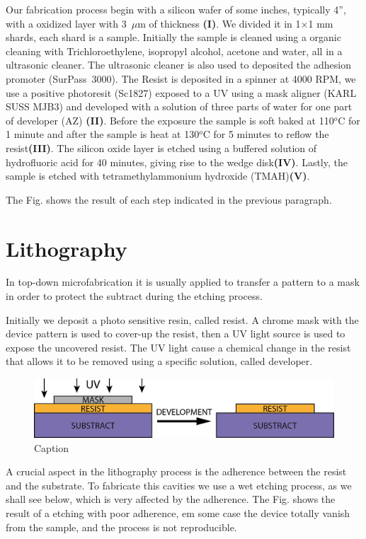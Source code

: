 Our fabrication process begin with a silicon wafer of some inches, typically 4'', with a oxidized layer with 3~$\mu$m of thickness \textbf{(I)}. We divided it in 1$\times$1 mm shards, each shard is a sample. Initially the sample is cleaned using a organic cleaning with Trichloroethylene, isopropyl alcohol, acetone and water, all in a ultrasonic cleaner. The ultrasonic cleaner is also used to deposited the adhesion promoter (SurPass\regmark~3000). The Resist is deposited in a spinner at 4000 RPM, we use a positive photoresit (Sc1827) exposed to a UV using a mask aligner (KARL SUSS MJB3) and developed with a solution of three parts of water for one part of developer (AZ) \textbf{(II)}. Before the exposure the sample is soft baked at 110$^o$C for 1 minute and after the sample is heat at 130$^o$C for 5 minutes to reflow the resist\textbf{(III)}. The silicon oxide layer is etched using a buffered solution of hydrofluoric acid for 40 minutes, giving rise to the wedge disk\textbf{(IV)}. Lastly, the sample is etched with tetramethylammonium hydroxide (TMAH)\textbf{(V)}. 

The Fig. shows the result of each step indicated in the previous paragraph. 


\section{Lithography}

In top-down microfabrication it is usually applied to transfer a pattern to a mask in order to protect the subtract during the etching process. 

Initially we deposit a photo sensitive resin, called resist. A chrome mask with the device pattern is used to cover-up the resist, then a UV light source is used to expose the uncovered resist. The UV light cause a chemical change in the resist that allows it to be removed using a specific solution, called developer. 
\begin{figure}[h!]
    \centering
    \includegraphics[width = 16cm]{figuras/Dissertation_litho.jpg}
    \caption{Caption}
    \label{fig:litho}
\end{figure}

A crucial aspect in the lithography process is the adherence between the resist and the substrate. To fabricate this cavities we use a wet etching process, as we shall see below, which is very affected by the adherence. The Fig.%
shows the result of a etching with poor adherence, em some case the device totally vanish from the sample, and the process is not reproducible.

